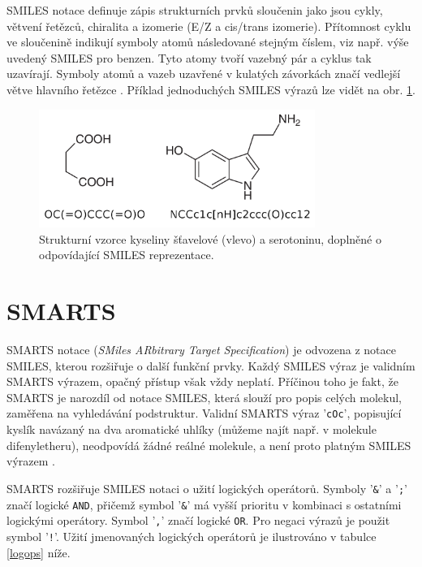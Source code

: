 SMILES notace definuje zápis strukturních prvků sloučenin jako jsou cykly, větvení řetězců, chiralita a izomerie (E/Z a cis/trans izomerie). Přítomnost cyklu ve sloučenině indikují symboly atomů následované stejným číslem, viz např. výše uvedený SMILES pro benzen. Tyto atomy tvoří vazebný pár a cyklus tak uzavírají. Symboly atomů a vazeb uzavřené v kulatých závorkách značí vedlejší větve hlavního řetězce \cite{SMILES_exm}. Příklad jednoduchých SMILES výrazů lze vidět na obr. \ref{SMILES_mols}. 

\begin{figure}[h]
\label{SMILES_mols}
\begin{center}
\includegraphics[width=9cm]{pictures/SMARTS_molecules.png}
\caption{Strukturní vzorce kyseliny šťavelové (vlevo) a serotoninu, doplněné o odpovídající SMILES reprezentace.}
\end{center}
\end{figure}
\section{SMARTS}
\label{SMARTS}
SMARTS notace  (\textit{SMiles ARbitrary Target Specification}) je odvozena z notace SMILES, kterou rozšiřuje o další funkční prvky. Každý SMILES výraz je validním SMARTS výrazem, opačný přístup však vždy neplatí. Příčinou toho je fakt, že SMARTS je narozdíl od  notace SMILES, která slouží pro popis celých molekul, zaměřena na vyhledávání podstruktur. Validní SMARTS výraz '\verb|cOc|', popisující kyslík navázaný na dva aromatické uhlíky (můžeme najít např. v molekule difenyletheru), neodpovídá žádné reálné molekule, a není proto platným SMILES výrazem \cite{SMARTS_intro, SMARTS_exm}. 

SMARTS rozšiřuje SMILES notaci o užití logických operátorů. Symboly '\verb|&|' a '\verb|;|' značí logické \verb|AND|, přičemž symbol '\verb|&|' má vyšší prioritu v kombinaci s ostatními logickými operátory. Symbol '\verb|,|' značí logické \verb|OR|. Pro negaci výrazů je použit symbol '\verb|!|'. Užití jmenovaných logických operátorů je ilustrováno v tabulce \ref{logops} níže.

